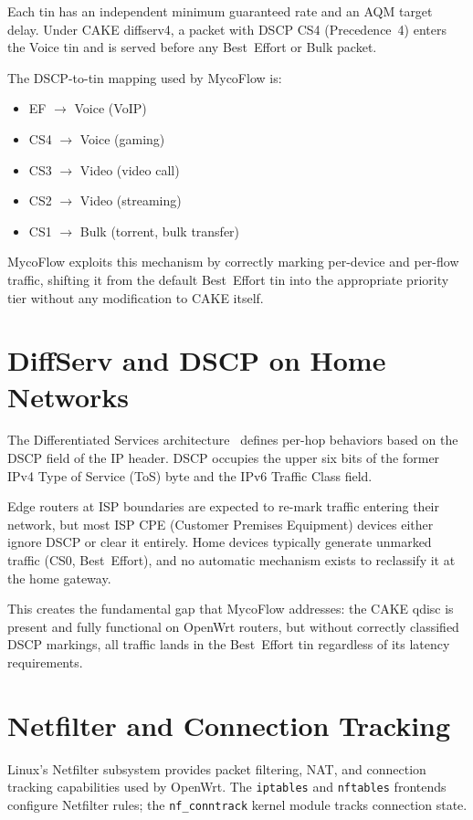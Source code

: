 Each tin has an independent minimum guaranteed rate and an AQM target delay. Under CAKE diffserv4, a packet with DSCP CS4 (Precedence~4) enters the Voice tin and is served before any Best~Effort or Bulk packet.

The DSCP-to-tin mapping used by MycoFlow is:
\begin{itemize}
  \item EF $\rightarrow$ Voice (VoIP)
  \item CS4 $\rightarrow$ Voice (gaming)
  \item CS3 $\rightarrow$ Video (video call)
  \item CS2 $\rightarrow$ Video (streaming)
  \item CS1 $\rightarrow$ Bulk (torrent, bulk transfer)
\end{itemize}

MycoFlow exploits this mechanism by correctly marking per-device and per-flow traffic, shifting it from the default Best~Effort tin into the appropriate priority tier without any modification to CAKE itself.

\section{DiffServ and DSCP on Home Networks}

The Differentiated Services architecture~\cite{rfc2474} defines per-hop behaviors based on the DSCP field of the IP header. DSCP occupies the upper six bits of the former IPv4 Type of Service (ToS) byte and the IPv6 Traffic Class field.

Edge routers at ISP boundaries are expected to re-mark traffic entering their network, but most ISP CPE (Customer Premises Equipment) devices either ignore DSCP or clear it entirely. Home devices typically generate unmarked traffic (CS0, Best~Effort), and no automatic mechanism exists to reclassify it at the home gateway.

This creates the fundamental gap that MycoFlow addresses: the CAKE qdisc is present and fully functional on OpenWrt routers, but without correctly classified DSCP markings, all traffic lands in the Best~Effort tin regardless of its latency requirements.

\section{Netfilter and Connection Tracking}

Linux's Netfilter subsystem provides packet filtering, NAT, and connection tracking capabilities used by OpenWrt. The \texttt{iptables} and \texttt{nftables} frontends configure Netfilter rules; the \texttt{nf\_conntrack} kernel module tracks connection state.

